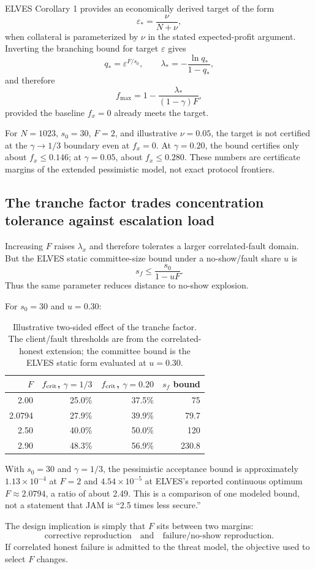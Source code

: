 ELVES Corollary 1 provides an economically derived target of the form
\[
\varepsilon_* = \frac{\nu}{N+\nu},
\]
when collateral is parameterized by \(\nu\) in the stated expected-profit argument. Inverting the branching bound for target \(\varepsilon\) gives
\[
q_* = \varepsilon^{F/s_0},
\qquad
\lambda_*=-\frac{\ln q_*}{1-q_*},
\]
and therefore
\[
\boxed{
 f_{\max}
 =1-\frac{\lambda_*}{(1-\gamma)F},
}
\]
provided the baseline \(f_x=0\) already meets the target.

For \(N=1023\), \(s_0=30\), \(F=2\), and illustrative \(\nu=0.05\), the target is not certified at the \(\gamma\to1/3\) boundary even at \(f_x=0\). At \(\gamma=0.20\), the bound certifies only about \(f_x\le0.146\); at \(\gamma=0.05\), about \(f_x\le0.280\). These numbers are certificate margins of the extended pessimistic model, not exact protocol frontiers.

\subsection{The tranche factor trades concentration tolerance against escalation load}

Increasing \(F\) raises \(\lambda_x\) and therefore tolerates a larger correlated-fault domain. But the ELVES static committee-size bound under a no-show/fault share \(u\) is
\[
 s_f\le\frac{s_0}{1-uF}.
\]
Thus the same parameter reduces distance to no-show explosion.

For \(s_0=30\) and \(u=0.30\):

\begin{table}[htbp]
\centering
\caption{Illustrative two-sided effect of the tranche factor. The client/fault thresholds are from the correlated-honest extension; the committee bound is the ELVES static form evaluated at \(u=0.30\).}
\label{tab:Ftradeoff}
\begin{tabular}{rrrr}
\toprule
\(F\) & \(f_{\rm crit}\), \(\gamma=1/3\) & \(f_{\rm crit}\), \(\gamma=0.20\) & \(s_f\) bound \\
\midrule
2.00 & 25.0\% & 37.5\% & 75 \\
2.0794 & 27.9\% & 39.9\% & 79.7 \\
2.50 & 40.0\% & 50.0\% & 120 \\
2.90 & 48.3\% & 56.9\% & 230.8 \\
\bottomrule
\end{tabular}
\end{table}

With \(s_0=30\) and \(\gamma=1/3\), the pessimistic acceptance bound is approximately \(1.13\times10^{-4}\) at \(F=2\) and \(4.54\times10^{-5}\) at ELVES's reported continuous optimum \(F\approx2.0794\), a ratio of about 2.49. This is a comparison of one modeled bound, not a statement that JAM is “2.5 times less secure.”

The design implication is simply that \(F\) sits between two margins:
\[
\boxed{
\text{corrective reproduction}
\quad\text{and}\quad
\text{failure/no-show reproduction}.
}
\]
If correlated honest failure is admitted to the threat model, the objective used to select \(F\) changes.
